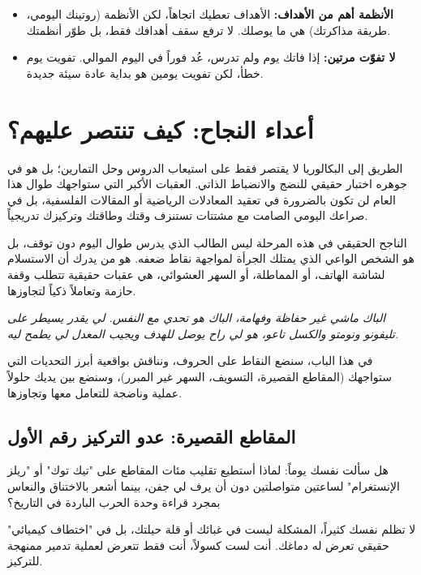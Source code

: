 \documentclass[12pt,a4paper]{book}
\newcommand{\quoteAr}[1]{%
	\begin{myquote}
		\itshape #1
	\end{myquote}
}
\begin{document}
\begin{itemize}
		\item \textbf{الأنظمة أهم من الأهداف:} الأهداف تعطيك اتجاهاً، لكن الأنظمة (روتينك اليومي، طريقة مذاكرتك) هي ما يوصلك. لا ترفع سقف أهدافك فقط، بل طوّر أنظمتك.
		
		\item \textbf{لا تفوّت مرتين:} إذا فاتك يوم ولم تدرس، عُد فوراً في اليوم الموالي. تفويت يوم خطأ، لكن تفويت يومين هو بداية عادة سيئة جديدة.
	\end{itemize}
	
	
	
	
	
	
	\chapter{أعداء النجاح: كيف تنتصر عليهم؟}
	\label{sec:owner-experiences5}
	\label{chap:enemies}
	
	الطريق إلى البكالوريا لا يقتصر فقط على استيعاب الدروس وحل التمارين؛ بل هو في جوهره اختبار حقيقي للنضج والانضباط الذاتي. العقبات الأكبر التي ستواجهك طوال هذا العام لن تكون بالضرورة في تعقيد المعادلات الرياضية أو المقالات الفلسفية، بل في صراعك اليومي الصامت مع مشتتات تستنزف وقتك وطاقتك وتركيزك تدريجياً.
	
	الناجح الحقيقي في هذه المرحلة ليس الطالب الذي يدرس طوال اليوم دون توقف، بل هو الشخص الواعي الذي يمتلك الجرأة لمواجهة نقاط ضعفه. هو من يدرك أن الاستسلام لشاشة الهاتف، أو المماطلة، أو السهر العشوائي، هي عقبات حقيقية تتطلب وقفة حازمة وتعاملاً ذكياً لتجاوزها.
	
	\quoteAr{الباك ماشي غير حفاظة وفهامة، الباك هو تحدي مع النفس. لي يقدر يسيطر على تليفونو ونومتو والكسل تاعو، هو لي راح يوصل للهدف ويجيب المعدل لي يطمح ليه.}
	
	في هذا الباب، سنضع النقاط على الحروف، ونناقش بواقعية أبرز التحديات التي ستواجهك (المقاطع القصيرة، التسويف، السهر غير المبرر)، وسنضع بين يديك حلولاً عملية وناضجة للتعامل معها وتجاوزها.
	
	\section{المقاطع القصيرة: عدو التركيز رقم الأول}
	
	هل سألت نفسك يوماً: لماذا أستطيع تقليب مئات المقاطع على "تيك توك" أو "ريلز الإنستغرام" لساعتين متواصلتين دون أن يرف لي جفن، بينما أشعر بالاختناق والنعاس بمجرد قراءة وحدة الحرب الباردة في التاريخ؟ 
	
	لا تظلم نفسك كثيراً، المشكلة ليست في غبائك أو قلة حيلتك، بل في "اختطاف كيميائي" حقيقي تعرض له دماغك. أنت لست كسولاً، أنت فقط تتعرض لعملية تدمير ممنهجة للتركيز.
	
\end{document}
